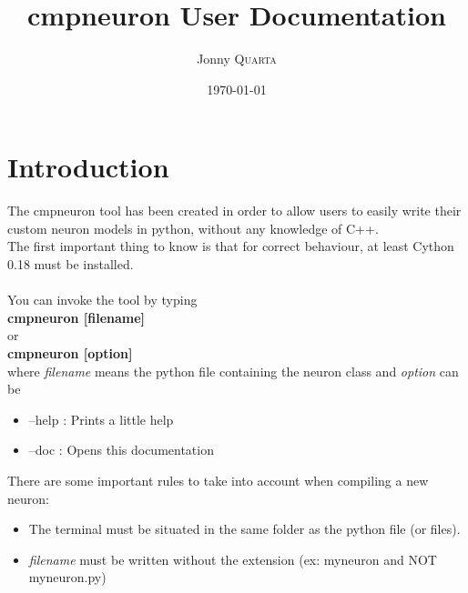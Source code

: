 \documentclass{article}
\title{cmpneuron User Documentation} %
\author{Jonny \textsc{Quarta}} %
\date{\today} %
\begin{document}
\maketitle %


\setlength\parindent{0pt} %

\renewcommand{\labelenumi}{\alph{enumi}.} %

\section{Introduction}
The cmpneuron tool has been created in order to allow users to easily write their custom neuron models in python, without any knowledge of C++.\\
The first important thing to know is that for correct behaviour, at least Cython 0.18 must be installed.\\ \\
You can invoke the tool by typing\\
\textbf{cmpneuron [filename]}\\
or \\
 \textbf{cmpneuron [option]} \\
where \emph{filename} means the python file containing the neuron class and \emph{option} can be
\begin{itemize}
\item --help : Prints a little help
\item --doc  : Opens this documentation
\end{itemize}

There are some important rules to take into account when compiling a new neuron:
\begin{itemize}
\item The terminal must be situated in the same folder as the python file (or files).
\item \emph{filename} must be written without the extension (ex: myneuron and NOT myneuron.py)
\end{itemize}
\end{document}
